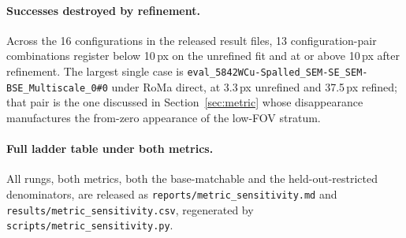 \documentclass[10pt]{article}
\begin{document}
\paragraph{Successes destroyed by refinement.} Across the 16 configurations in the released result files, 13 configuration-pair combinations register below 10\,px on the unrefined fit and at or above 10\,px after refinement. The largest single case is \texttt{eval\_5842WCu-Spalled\_SEM-SE\_SEM-BSE\_Multiscale\_0\#0} under RoMa direct, at 3.3\,px unrefined and 37.5\,px refined; that pair is the one discussed in Section~\ref{sec:metric} whose disappearance manufactures the from-zero appearance of the low-FOV stratum.

\paragraph{Full ladder table under both metrics.} All rungs, both metrics, both the base-matchable and the held-out-restricted denominators, are released as \texttt{reports/metric\_sensitivity.md} and \texttt{results/metric\_sensitivity.csv}, regenerated by \texttt{scripts/metric\_sensitivity.py}.
\end{document}
